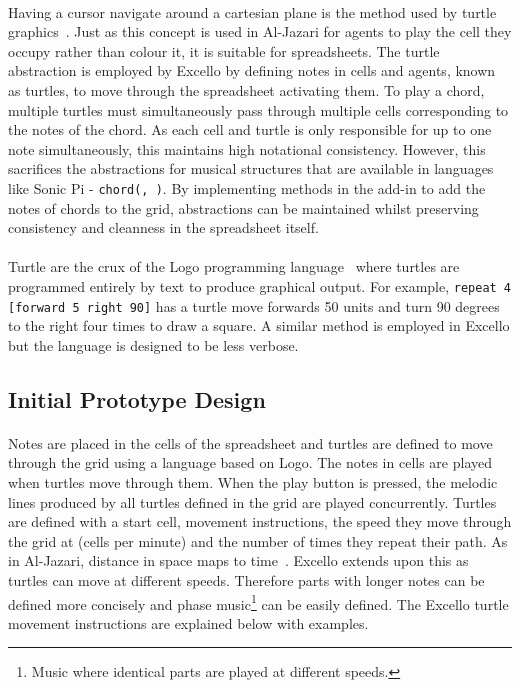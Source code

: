 \paragraph{} Having a cursor navigate around a cartesian plane is the method used by turtle graphics~\cite{papert:turtleGraphics}. Just as this concept is used in Al-Jazari for agents to play the cell they occupy rather than colour it, it is suitable for spreadsheets. The turtle abstraction is employed by Excello by defining notes in cells and agents, known as turtles, to move through the spreadsheet activating them. To play a chord, multiple turtles must simultaneously pass through multiple cells corresponding to the notes of the chord. As each cell and turtle is only responsible for up to one note simultaneously, this maintains high notational consistency. However, this sacrifices the abstractions for musical structures that are available in languages like Sonic Pi - \texttt{chord(, )}. By implementing methods in the add-in to add the notes of chords to the grid, abstractions can be maintained whilst preserving consistency and cleanness in the spreadsheet itself.

\paragraph{} Turtle are the crux of the Logo programming language~\cite{goldman:turtle} where turtles are programmed entirely by text to produce graphical output. For example, \texttt{repeat 4 [forward 5 right 90]} has a turtle move forwards 50 units and turn 90 degrees to the right four times to draw a square. A similar method is employed in Excello but the language is designed to be less verbose.

\subsection{Initial Prototype Design}

\paragraph{} Notes are placed in the cells of the spreadsheet and turtles are defined to move through the grid using a language based on Logo. The notes in cells are played when turtles move through them. When the play button is pressed, the melodic lines produced by all turtles defined in the grid are played concurrently. Turtles are defined with a start cell, movement instructions, the speed they move through the grid at (cells per minute) and the number of times they repeat their path. As in Al-Jazari, distance in space maps to time~\cite{mclean:texture}. Excello extends upon this as turtles can move at different speeds. Therefore parts with longer notes can be defined more concisely and phase music\footnote{Music where identical parts are played at different speeds.} can be easily defined. The Excello turtle movement instructions are explained below with examples.

